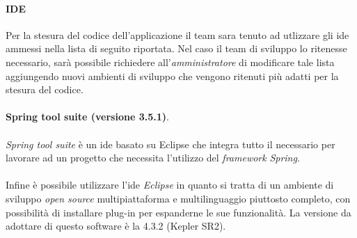 \paragraph{IDE}
Per la stesura del codice dell'applicazione \progetto{} il team \gruppo{} sara tenuto ad utlizzare gli ide ammessi nella lista di seguito riportata. Nel caso il team di sviluppo lo ritenesse necessario, sarà possibile richiedere all'\textit{amministratore} di modificare tale lista aggiungendo nuovi ambienti di sviluppo che vengono ritenuti più adatti per la stesura del codice.
\\
\\
\textbf{Spring tool suite (versione 3.5.1)}.
\\
\\
\textit{Spring tool suite} è un ide basato su Eclipse che integra tutto il necessario per lavorare ad un progetto che necessita l'utilizzo del \textit{framework} \textit{Spring}.
\\
\\
Infine è possibile utilizzare l'ide \textit{Eclipse} in quanto si tratta di un ambiente di sviluppo \textit{open source} multipiattaforma e multilinguaggio piuttosto completo, con possibilità di installare plug-in per espanderne le sue funzionalità.
La versione da adottare di questo software è la 4.3.2 (Kepler SR2).


